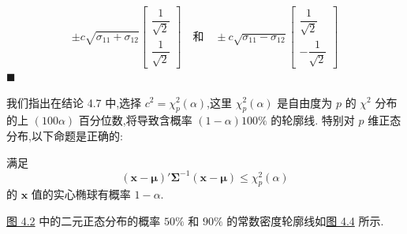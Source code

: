 \[
\pm c\sqrt{\sigma_{11}+\sigma_{12}}\begin{bmatrix}\dfrac{1}{\sqrt{2}}\\[2ex]\dfrac{1}{\sqrt{2}}\end{bmatrix}
\quad\text{和}\quad
\pm c\sqrt{\sigma_{11}-\sigma_{12}}\begin{bmatrix}\dfrac{1}{\sqrt{2}}\\[2ex]-\dfrac{1}{\sqrt{2}}\end{bmatrix}
\]
\hfill$\blacksquare$

我们指出在结论 4.7 中,选择 $c^{2}=\chi_p^{2}(\alpha)$,这里 $\chi_p^{2}(\alpha)$ 是自由度为 $p$ 的 $\chi^{2}$ 分布的上 $(100\alpha)$ 百分位数,将导致含概率 $(1-\alpha)100\%$ 的轮廓线. 特别对 $p$ 维正态分布,以下命题是正确的:

\begin{mvbox}
满足
\label{eq:4-8}
\begin{equation}
(\mathbf{x}-\boldsymbol{\mu})'\boldsymbol{\Sigma}^{-1}(\mathbf{x}-\boldsymbol{\mu})\leqslant\chi_p^{2}(\alpha)
\tag{4-8}
\end{equation}
的 $\mathbf{x}$ 值的实心椭球有概率 $1-\alpha$.
\end{mvbox}

\hyperref[fig:4.2]{图 4.2} 中的二元正态分布的概率 $50\%$ 和 $90\%$ 的常数密度轮廓线如\hyperref[fig:4.4]{图 4.4} 所示.

